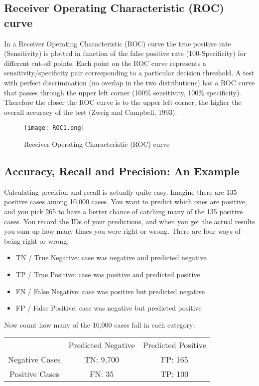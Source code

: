 \documentclass[12pt]{article} %
\begin{document}
\subsection{Receiver Operating Characteristic (ROC) curve }


In a Receiver Operating Characteristic (ROC) curve the true positive rate (Sensitivity) is plotted in function of the false positive rate (100-Specificity) for different cut-off points. Each point on the ROC curve represents a sensitivity/specificity pair corresponding to a particular decision threshold. A test with perfect discrimination (no overlap in the two distributions) has a ROC curve that passes through the upper left corner (100\% sensitivity, 100\% specificity). Therefore the closer the ROC curve is to the upper left corner, the higher the overall accuracy of the test (Zweig and Campbell, 1993).

\begin{figure}
  \texttt{[image: ROC1.png]}\\
  \caption{Receiver Operating Characteristic (ROC) curve }\label{ROC1}
\end{figure}


\subsection{Accuracy, Recall and Precision: An Example}
Calculating precision and recall is actually quite easy. Imagine there are 135 positive cases among 10,000 cases. You want to predict which ones are positive, and you pick 265 to have a better chance of catching many of the 135 positive cases.  You record the IDs of your predictions, and when you get the actual results you sum up how many times you were right or wrong. There are four ways of being right or wrong:

\begin{itemize}
\item TN / True Negative: case was negative and predicted negative
\item TP / True Positive: case was positive and predicted positive
\item FN / False Negative: case was positive but predicted negative
\item FP / False Positive: case was negative but predicted positive
\end{itemize}

Now count how many of the 10,000 cases fall in each category:
\begin{center}
\begin{tabular}{|c|c|c|}
  \hline
&Predicted Negative & Predicted Positive\\
Negative Cases & TN: 9,700 & FP: 165 \\
Positive Cases & FN: 35 & TP: 100 \\

  \hline
\end{tabular}
\end{center}
\end{document}
